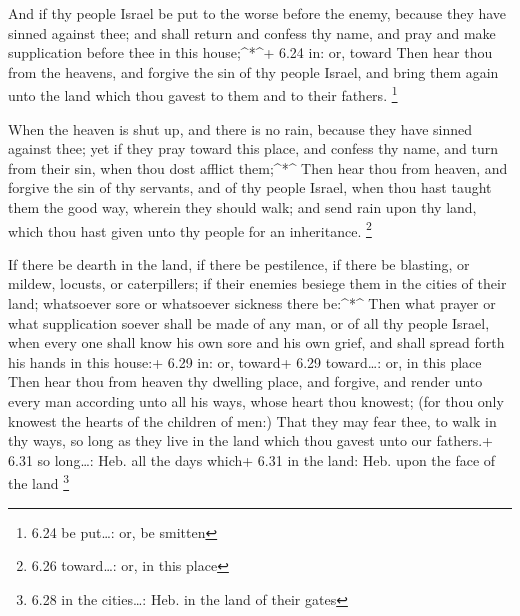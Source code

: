  And if thy people Israel be put to the worse before the
enemy, because they have sinned against thee; and shall return and
confess thy name, and pray and make supplication before thee in this
house;\^{}*\^{}+ 6.24 in: or, toward  Then hear thou from
the heavens, and forgive the sin of thy people Israel, and bring them
again unto the land which thou gavest to them and to their fathers.
\footnote{6.24 be put\ldots: or, be smitten}

 When the heaven is shut up, and there is no rain, because
they have sinned against thee; yet if they pray toward this place, and
confess thy name, and turn from their sin, when thou dost afflict
them;\^{}*\^{}  Then hear thou from heaven, and forgive the
sin of thy servants, and of thy people Israel, when thou hast taught
them the good way, wherein they should walk; and send rain upon thy
land, which thou hast given unto thy people for an inheritance.
\footnote{6.26 toward\ldots: or, in this place}

 If there be dearth in the land, if there be pestilence, if
there be blasting, or mildew, locusts, or caterpillers; if their enemies
besiege them in the cities of their land; whatsoever sore or whatsoever
sickness there be:\^{}*\^{}  Then what prayer or what
supplication soever shall be made of any man, or of all thy people
Israel, when every one shall know his own sore and his own grief, and
shall spread forth his hands in this house:+ 6.29 in: or, toward+ 6.29
toward\ldots: or, in this place  Then hear thou from heaven
thy dwelling place, and forgive, and render unto every man according
unto all his ways, whose heart thou knowest; (for thou only knowest the
hearts of the children of men:)  That they may fear thee,
to walk in thy ways, so long as they live in the land which thou gavest
unto our fathers.+ 6.31 so long\ldots: Heb. all the days which+ 6.31 in
the land: Heb. upon the face of the land \footnote{6.28 in the
  cities\ldots: Heb. in the land of their gates}

